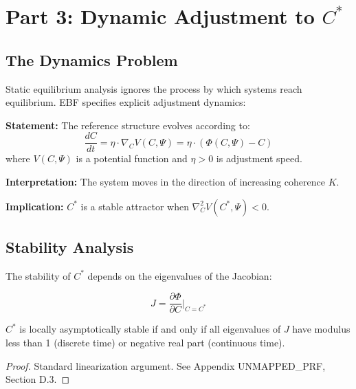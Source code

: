 \section{Part 3: Dynamic Adjustment to $C^*$}
\label{sec:az-dynamics}

\subsection{The Dynamics Problem}

Static equilibrium analysis ignores the process by which systems reach equilibrium.
EBF specifies explicit adjustment dynamics:

\begin{tcolorbox}[colback=gray!5!white, colframe=gray!75!black,
    title=Axiom AZ-D1: Gradient Adjustment Dynamics]
\textbf{Statement:} The reference structure evolves according to:
\begin{equation}
\frac{dC}{dt} = \eta \cdot \nabla_C V(C, \Psi) = \eta \cdot (\Phi(C, \Psi) - C)
\end{equation}
where $V(C, \Psi)$ is a potential function and $\eta > 0$ is adjustment speed.

\textbf{Interpretation:} The system moves in the direction of increasing coherence $K$.

\textbf{Implication:} $C^*$ is a stable attractor when $\nabla^2_C V(C^*, \Psi) < 0$.
\end{tcolorbox}

\subsection{Stability Analysis}

The stability of $C^*$ depends on the eigenvalues of the Jacobian:

\begin{equation}
J = \frac{\partial \Phi}{\partial C}\bigg|_{C=C^*}
\end{equation}

\begin{proposition}
$C^*$ is locally asymptotically stable if and only if all eigenvalues of $J$
have modulus less than 1 (discrete time) or negative real part (continuous time).
\end{proposition}

\begin{proof}
Standard linearization argument. See Appendix UNMAPPED_PRF, Section D.3.
\end{proof}

